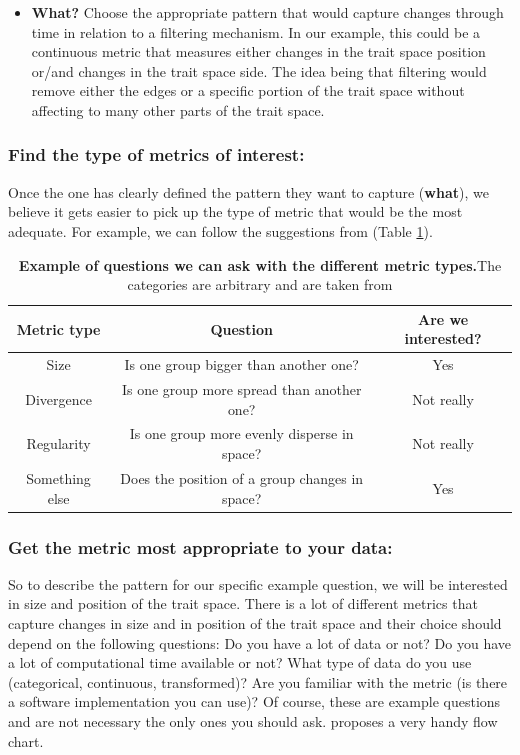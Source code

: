 \documentclass[12pt,letterpaper]{article}
\begin{document}
\begin{itemize}
    \item \textbf{What?} Choose the appropriate pattern that would capture changes through time in relation to a filtering mechanism. In our example, this could be a continuous metric that measures either changes in the trait space position or/and changes in the trait space side. The idea being that filtering would remove either the edges or a specific portion of the trait space without affecting to many other parts of the trait space.
\end{itemize}


\subsubsection{Find the type of metrics of interest:}

Once the one has clearly defined the pattern they want to capture (\textbf{what}), we believe it gets easier to pick up the type of metric that would be the most adequate.
For example, we can follow the suggestions from \cite{mammola2021concepts} (Table \ref{Tab:box2}).

\begin{table}
\center
\begin{tabular}{c | c | c}
\textbf{Metric type}  & \textbf{Question} & \textbf{Are we interested?}\\
\hline
Size & Is one group bigger than another one? & Yes \\
Divergence & Is one group more spread than another one? & Not really \\
Regularity & Is one group more evenly disperse in space? & Not really \\
Something else  & Does the position of a group changes in space? & Yes \\
\end{tabular}
\caption{\textbf{Example of questions we can ask with the different metric types.}The categories are arbitrary and are taken from \cite{mammola2021concepts}}
\label{Tab:box2}
\end{table}


\subsubsection{Get the metric most appropriate to your data:}

So to describe the pattern for our specific example question, we will be interested in size and position of the trait space.
There is a lot of different metrics that capture changes in size and in position of the trait space and their choice should depend on the following questions:
Do you have a lot of data or not?
Do you have a lot of computational time available or not?
What type of data do you use (categorical, continuous, transformed)?
Are you familiar with the metric (is there a software implementation you can use)?
Of course, these are example questions and are not necessary the only ones you should ask.
\cite{mammola2021concepts} proposes a very handy flow chart.
\end{document}
